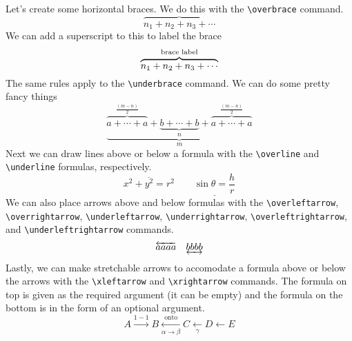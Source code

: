 \documentclass[12pt]{amsart}
\begin{document}
Let's create some horizontal braces. We do this with the \verb+\overbrace+ command.
\[
   \overbrace{n_1 + n_2 + n_3 + \cdots}
\]
We can add a superscript to this to label the brace
\[
   \overbrace{n_1 + n_2 + n_3 + \cdots}^{\textnormal{brace label}}
\]
The same rules apply to the \verb+\underbrace+ command. We can do some pretty fancy things
\[
   \underbrace{
      \overbrace{a + \cdots + a}^{\frac{(m - n)}{2}} + 
      \underbrace{b + \cdots + b}_n + 
      \overbrace{a + \cdots + a}^{\frac{(m - n)}{2}}
   }_{m}
\]
Next we can draw lines above or below a formula with the \verb+\overline+ and \verb+\underline+ formulas, respectively.
\[
   \overline{x^2 + y^2 = r^2} \qquad \underline{\sin \theta = \frac{h}{r}}
\]
We can also place arrows above and below formulas with the \verb+\overleftarrow+, \verb+\overrightarrow+, \verb+\underleftarrow+, \verb+\underrightarrow+, \verb+\overleftrightarrow+, and \verb+\underleftrightarrow+ commands. 
\[
   \overleftarrow{aaaa} \quad \underleftrightarrow{bbbb}
\]
Lastly, we can make stretchable arrows to accomodate a formula above or below the arrows with the \verb+\xleftarrow+ and \verb+\xrightarrow+ commands. The formula on top is given as the required argument (it can be empty) and the formula on the bottom is in the form of an optional argument. 
\[
   A \xrightarrow{1-1}  B \xleftarrow[\alpha \to \beta]{\text{onto}} C \xleftarrow[\gamma]{} D \xleftarrow{} E
\]

\end{document}
